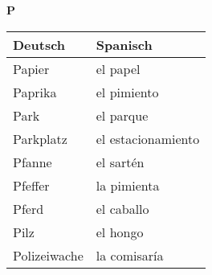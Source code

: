 \begin{flushright}\begin{Huge}\textbf{P}\end{Huge}\end{flushright}

\begin{longtable}{p{} p{}} 
\textbf{Deutsch}     & \textbf{Spanisch}                                       \\ \hline
\hline
\endhead %
Papier & el papel \\
Paprika & el pimiento\\
Park & el parque \\
Parkplatz & el estacionamiento \\
Pfanne & el sartén\\
Pfeffer & la pimienta\\
Pferd & el caballo\\
Pilz & el hongo\\
Polizeiwache & la comisaría 
\end{longtable}
